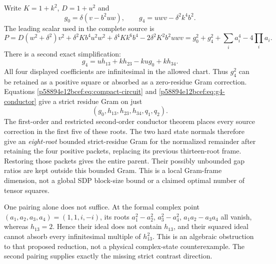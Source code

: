 Write $K=1+k^2$, $D=1+u^2$ and
\[
g_0=\delta(v-b^2uw),\qquad g_4=uwv-\delta^2k^4b^2.
\]
The leading scalar used in the complete source is
\[
P=D(w^2+\delta^2)v^2+\delta^2Kb^4u^2w^2+
\delta^4Kk^6b^4-2\delta^2K^2b^2uwv
=g_0^2+g_4^2+\sum_i a_i^4-4\prod_i a_i.
\]
There is a second exact simplification:
\begin{equation}
g_4=u h_{13}+k h_{23}-ku g_0+k h_{34}.\label{p58894e12bcef:eq:g4-conductor}
\end{equation}
All four displayed coefficients are infinitesimal in the allowed chart.
Thus $g_4^2$ can be retained as a positive square or absorbed as a
zero-residue Gram correction. Equations \eqref{p58894e12bcef:eq:compact-circuit} and
\eqref{p58894e12bcef:eq:g4-conductor} give a strict residue Gram on just
\[
\boxed{(g_0,h_{13},h_{23},h_{34},q_1,q_2).}
\]
The first-order and restricted second-order conductor theorem places
every source correction in the first five of these roots. The two hard
state normals therefore give an \emph{eight-root} bounded strict-residue
Gram for the normalized remainder after retaining the four positive
packets, replacing its previous thirteen-root frame. Restoring those
packets gives the entire parent. Their possibly unbounded gap ratios
are kept outside this bounded Gram. This is a local Gram-frame
dimension, not a global SDP block-size bound or a claimed optimal number
of tensor squares.

One pairing alone does not suffice. At the formal complex point
$(a_1,a_2,a_3,a_4)=(1,1,i,-i)$, its roots
$a_1^2-a_2^2$, $a_3^2-a_4^2$, $a_1a_2-a_3a_4$ all vanish, whereas
$h_{13}=2$. Hence their ideal does not contain $h_{13}$, and their squared
ideal cannot absorb every infinitesimal multiple of $h_{13}^2$.
This is an algebraic obstruction to that proposed reduction, not a physical
complex-state counterexample. The second pairing supplies exactly the
missing strict contrast direction.
